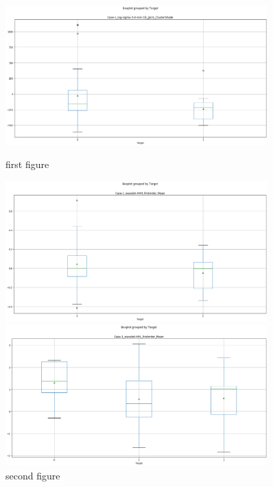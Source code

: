 \documentclass[final,1p,times,twocolumn]{elsarticle}
\begin{document}
\begin{figure}
    \centering
    \begin{minipage}{0.45\textwidth}
        \centering
        \includegraphics[width=0.9\textwidth]{bg1.png} %
        \caption{first figure}
    \end{minipage}\hfill
    \begin{minipage}{0.45\textwidth}
        \centering
        \includegraphics[width=0.9\textwidth]{bg2.png} %
        \caption{second figure}
    \end{minipage}
    \begin{minipage}{0.45\textwidth}
        \centering
        \includegraphics[width=0.9\textwidth]{tg1.png} %

\end{minipage}
\end{figure}
\end{document}
